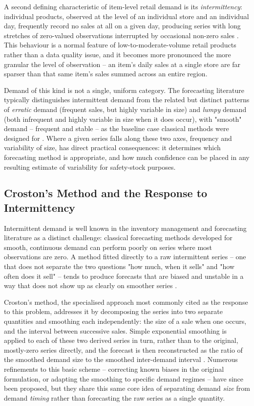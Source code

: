 A second defining characteristic of item-level retail demand is its \emph{intermittency}: individual products, observed at the level of an individual store and an individual day, frequently record no sales at all on a given day, producing series with long stretches of zero-valued observations interrupted by occasional non-zero sales \cite{Syntetos:2005}. This behaviour is a normal feature of low-to-moderate-volume retail products rather than a data quality issue, and it becomes more pronounced the more granular the level of observation -- an item's daily sales at a single store are far sparser than that same item's sales summed across an entire region.

Demand of this kind is not a single, uniform category. The forecasting literature typically distinguishes intermittent demand from the related but distinct patterns of \emph{erratic} demand (frequent sales, but highly variable in size) and \emph{lumpy} demand (both infrequent and highly variable in size when it does occur), with "smooth" demand -- frequent and stable -- as the baseline case classical methods were designed for \cite{Syntetos:2005}. Where a given series falls along these two axes, frequency and variability of size, has direct practical consequences: it determines which forecasting method is appropriate, and how much confidence can be placed in any resulting estimate of variability for safety-stock purposes.

\subsection{Croston's Method and the Response to Intermittency}
\label{sec:crostonMethodBackground}

Intermittent demand is well known in the inventory management and forecasting literature as a distinct challenge: classical forecasting methods developed for smooth, continuous demand can perform poorly on series where most observations are zero. A method fitted directly to a raw intermittent series -- one that does not separate the two questions "how much, when it sells" and "how often does it sell" -- tends to produce forecasts that are biased and unstable in a way that does not show up as clearly on smoother series \cite{Croston:1972}.

Croston's method, the specialised approach most commonly cited as the response to this problem, addresses it by decomposing the series into two separate quantities and smoothing each independently: the size of a sale when one occurs, and the interval between successive sales. Simple exponential smoothing is applied to each of these two derived series in turn, rather than to the original, mostly-zero series directly, and the forecast is then reconstructed as the ratio of the smoothed demand size to the smoothed inter-demand interval \cite{Croston:1972}. Numerous refinements to this basic scheme -- correcting known biases in the original formulation, or adapting the smoothing to specific demand regimes -- have since been proposed, but they share this same core idea of separating demand \emph{size} from demand \emph{timing} rather than forecasting the raw series as a single quantity.

